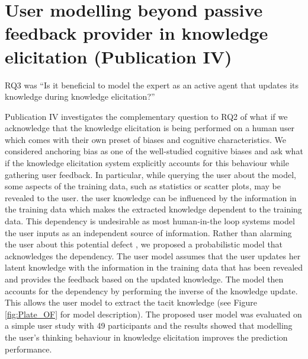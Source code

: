 \documentclass[dissertation,math,vertlayout,pdfa,colorlinks]{aaltoseries}
\begin{document}



\section{User modelling beyond passive feedback provider in knowledge elicitation (Publication IV)}

RQ3 was ``Is it beneficial to model the expert as an active agent that updates its knowledge during knowledge elicitation?''

Publication IV investigates the complementary question to RQ2 of what if we acknowledge that the knowledge elicitation is being performed on a human user which comes with their own preset of biases and cognitive characteristics. We considered anchoring bias as one of the well-studied cognitive biases \cite{Tversky1974} and ask what if the knowledge elicitation system explicitly accounts for this behaviour while gathering user feedback. In particular, while querying the user about the model, some aspects of the training data, such as statistics or scatter plots, may be revealed to the user. 
the user knowledge can be influenced by the information in the training data which makes the extracted knowledge dependent to the training data. This dependency is undesirable as most human-in-the loop systems model the user inputs as an independent source of information. Rather than alarming the user about this potential defect \cite{bias_warning}, we proposed a probabilistic model that acknowledges the dependency. The user model assumes that the user updates her latent knowledge with the information in the training data that has been revealed and provides the feedback based on the updated knowledge. The model then accounts for the dependency by performing the inverse of the knowledge update. This allows the user model to extract the tacit knowledge (see Figure \ref{fig:Plate_OF} for model description). The proposed user model was evaluated on a simple user study with 49 participants and the results showed that modelling the user's thinking behaviour in knowledge elicitation improves the prediction performance.
\end{document}
